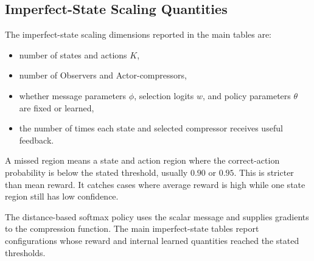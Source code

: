 \documentclass[11pt]{article}
\begin{document}
\subsection*{Imperfect-State Scaling Quantities}

The imperfect-state scaling dimensions reported in the main tables are:
\begin{itemize}
  \item number of states and actions \(K\),
  \item number of Observers and Actor-compressors,
  \item whether message parameters \(\phi\), selection logits \(w\), and policy
  parameters \(\theta\) are fixed or learned,
  \item the number of times each state and selected compressor receives useful
  feedback.
\end{itemize}

A missed region means a state and action region where the correct-action
probability is below the stated threshold, usually \(0.90\) or \(0.95\). This is
stricter than mean reward. It catches cases where average reward is high while
one state region still has low confidence.

The distance-based softmax policy uses the scalar message and supplies gradients
to the compression function. The main imperfect-state tables report
configurations whose reward and internal learned quantities reached the stated
thresholds.
\end{document}
